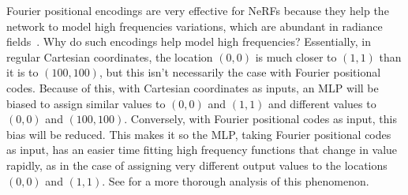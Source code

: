 Fourier positional encodings are very effective for NeRFs because they help the network to model high frequencies variations, which are abundant in radiance fields~\cite{tancik2020fourier}. Why do such encodings help model high frequencies? Essentially, in regular Cartesian coordinates, the location $(0,0)$ is much closer to $(1,1)$ than it is to $(100,100)$, but this isn't necessarily the case with Fourier positional codes. 
Because of this, with Cartesian coordinates as inputs, an MLP will be biased to assign similar values to $(0,0)$ and $(1,1)$ and different values to $(0,0)$ and $(100,100)$. Conversely, with Fourier 
positional codes as input, this bias will be reduced. This makes it so the MLP, taking Fourier positional codes as input, has an easier time fitting high frequency functions that change in value rapidly, as in the case of assigning very different output values to the locations $(0,0)$ and $(1,1)$. See \cite{tancik2020fourier} for a more thorough analysis of this phenomenon.






